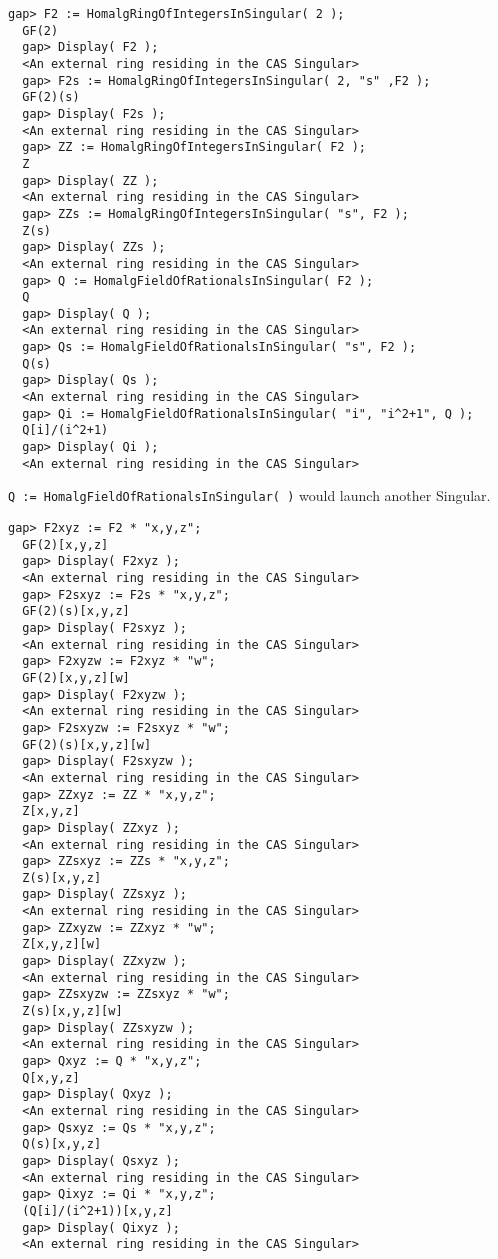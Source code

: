 \documentclass[a4paper,11pt]{report}
\begin{document}
{{{\begin{Verbatim}[fontsize=\small,frame=single,label=Example]
  gap> F2 := HomalgRingOfIntegersInSingular( 2 );
  GF(2)
  gap> Display( F2 );
  <An external ring residing in the CAS Singular>
  gap> F2s := HomalgRingOfIntegersInSingular( 2, "s" ,F2 );
  GF(2)(s)
  gap> Display( F2s );
  <An external ring residing in the CAS Singular>
  gap> ZZ := HomalgRingOfIntegersInSingular( F2 );
  Z
  gap> Display( ZZ );
  <An external ring residing in the CAS Singular>
  gap> ZZs := HomalgRingOfIntegersInSingular( "s", F2 );
  Z(s)
  gap> Display( ZZs );
  <An external ring residing in the CAS Singular>
  gap> Q := HomalgFieldOfRationalsInSingular( F2 );
  Q
  gap> Display( Q );
  <An external ring residing in the CAS Singular>
  gap> Qs := HomalgFieldOfRationalsInSingular( "s", F2 );
  Q(s)
  gap> Display( Qs );
  <An external ring residing in the CAS Singular>
  gap> Qi := HomalgFieldOfRationalsInSingular( "i", "i^2+1", Q );
  Q[i]/(i^2+1)
  gap> Display( Qi );
  <An external ring residing in the CAS Singular>
\end{Verbatim}
 \texttt{Q := HomalgFieldOfRationalsInSingular( )} would launch another Singular. 
\begin{Verbatim}[fontsize=\small,frame=single,label=Example]
  gap> F2xyz := F2 * "x,y,z";
  GF(2)[x,y,z]
  gap> Display( F2xyz );
  <An external ring residing in the CAS Singular>
  gap> F2sxyz := F2s * "x,y,z";
  GF(2)(s)[x,y,z]
  gap> Display( F2sxyz );
  <An external ring residing in the CAS Singular>
  gap> F2xyzw := F2xyz * "w";
  GF(2)[x,y,z][w]
  gap> Display( F2xyzw );
  <An external ring residing in the CAS Singular>
  gap> F2sxyzw := F2sxyz * "w";
  GF(2)(s)[x,y,z][w]
  gap> Display( F2sxyzw );
  <An external ring residing in the CAS Singular>
  gap> ZZxyz := ZZ * "x,y,z";
  Z[x,y,z]
  gap> Display( ZZxyz );
  <An external ring residing in the CAS Singular>
  gap> ZZsxyz := ZZs * "x,y,z";
  Z(s)[x,y,z]
  gap> Display( ZZsxyz );
  <An external ring residing in the CAS Singular>
  gap> ZZxyzw := ZZxyz * "w";
  Z[x,y,z][w]
  gap> Display( ZZxyzw );
  <An external ring residing in the CAS Singular>
  gap> ZZsxyzw := ZZsxyz * "w";
  Z(s)[x,y,z][w]
  gap> Display( ZZsxyzw );
  <An external ring residing in the CAS Singular>
  gap> Qxyz := Q * "x,y,z";
  Q[x,y,z]
  gap> Display( Qxyz );
  <An external ring residing in the CAS Singular>
  gap> Qsxyz := Qs * "x,y,z";
  Q(s)[x,y,z]
  gap> Display( Qsxyz );
  <An external ring residing in the CAS Singular>
  gap> Qixyz := Qi * "x,y,z";
  (Q[i]/(i^2+1))[x,y,z]
  gap> Display( Qixyz );
  <An external ring residing in the CAS Singular>

\end{Verbatim}}}}
\end{document}
